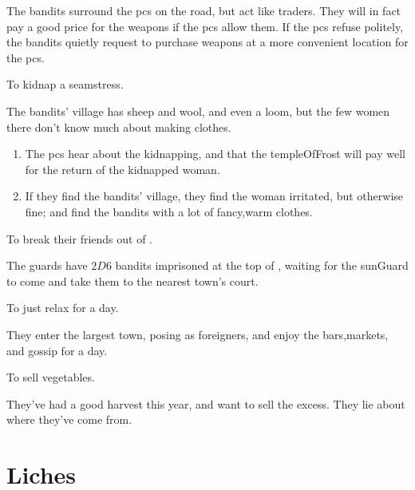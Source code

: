 \begin{multicols}{2}
\begin{dlistDouble}
  The bandits surround the \glspl{pc} on the road, but act like traders.
  They will in fact pay a good price for the weapons if the \glspl{pc} allow them.
  If the \glspl{pc} refuse politely, the bandits quietly request to purchase weapons at a more convenient location for the \glspl{pc}.
  \item
  To kidnap a seamstress.

  The bandits' \gls{village} has sheep and wool, and even a loom, but the few women there don't know much about making clothes.

  \begin{enumerate}
    \item
    The \glspl{pc} hear about the kidnapping, and that the \gls{templeOfFrost} will pay well for the return of the kidnapped woman.

    \item
    If they find the bandits' \gls{village}, they find the woman irritated, but otherwise fine; and find the bandits with a lot of fancy,warm clothes.
  \end{enumerate}
  \item
  To break their friends out of .

  The \glspl{guard} have $2D6$ bandits imprisoned at the top of , waiting for the \gls{sunGuard} to come and take them to the nearest town's \gls{court}.
  \item
  To just relax for a day.

  They enter the largest town, posing as foreigners, and enjoy the bars,markets, and gossip for a day.
  \item
  To sell vegetables.

  They've had a good harvest this year, and want to sell the excess.
  They lie about where they've come from.
\end{dlistDouble}

\end{multicols}

\section[Lich]{Liches}
\label{lich}

